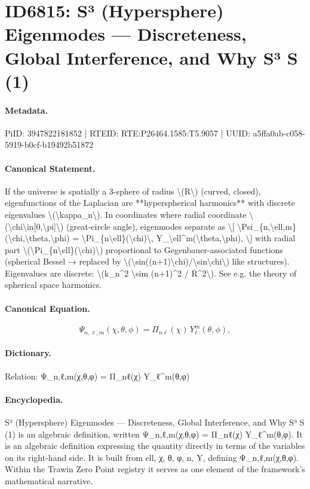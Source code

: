 \section*{ID6815: S³ (Hypersphere) Eigenmodes — Discreteness, Global Interference, and Why S³ S (1)}
\paragraph{Metadata.}
PiID: 3947822181852 | RTEID: RTE:P26464.1585:T5.9057 | UUID: a5ffa0ab-c058-5919-b0cf-b19492b51872

\paragraph{Canonical Statement.}
If the universe is spatially a 3-sphere of radius \textbackslash{}(R\textbackslash{}) (curved, closed), eigenfunctions of the Laplacian are **hyperspherical harmonics** with discrete eigenvalues \textbackslash{}(\textbackslash{}kappa\_n\textbackslash{}). In coordinates where radial coordinate \textbackslash{}(\textbackslash{}chi\textbackslash{}in[0,\textbackslash{}pi]\textbackslash{}) (great-circle angle), eigenmodes separate as \textbackslash{}[ \textbackslash{}Psi\_\{n,\textbackslash{}ell,m\}(\textbackslash{}chi,\textbackslash{}theta,\textbackslash{}phi) = \textbackslash{}Pi\_\{n\textbackslash{}ell\}(\textbackslash{}chi)\textbackslash{}, Y\_\textbackslash{}ell\textasciicircum{}m(\textbackslash{}theta,\textbackslash{}phi), \textbackslash{}] with radial part \textbackslash{}(\textbackslash{}Pi\_\{n\textbackslash{}ell\}(\textbackslash{}chi)\textbackslash{}) proportional to Gegenbauer-associated functions (spherical Bessel → replaced by \textbackslash{}(\textbackslash{}sin((n+1)\textbackslash{}chi)/\textbackslash{}sin\textbackslash{}chi\textbackslash{}) like structures). Eigenvalues are discrete: \textbackslash{}(k\_n\textasciicircum{}2 \textbackslash{}sim (n+1)\textasciicircum{}2 / R\textasciicircum{}2\textbackslash{}). See e.g. the theory of spherical space harmonics.

\paragraph{Canonical Equation.}
\[
\Psi_{n,\ell,m}(\chi,\theta,\phi) = \Pi_{n\ell}(\chi)\, Y_\ell^m(\theta,\phi),
\]

\paragraph{Dictionary.}
Relation: Ψ\_n,ℓ,m(χ,θ,φ) = Π\_nℓ(χ) Y\_ℓ\textasciicircum{}m(θ,φ)

\paragraph{Encyclopedia.}
S³ (Hypersphere) Eigenmodes — Discreteness, Global Interference, and Why S³ S (1) is an algebraic definition, written Ψ\_n,ℓ,m(χ,θ,φ) = Π\_nℓ(χ) Y\_ℓ\textasciicircum{}m(θ,φ). It is an algebraic definition expressing the quantity directly in terms of the variables on its right-hand side. It is built from ell, χ, θ, φ, n, Y, defining Ψ\_n,ℓ,m(χ,θ,φ). Within the Trawin Zero Point registry it serves as one element of the framework's mathematical narrative.
